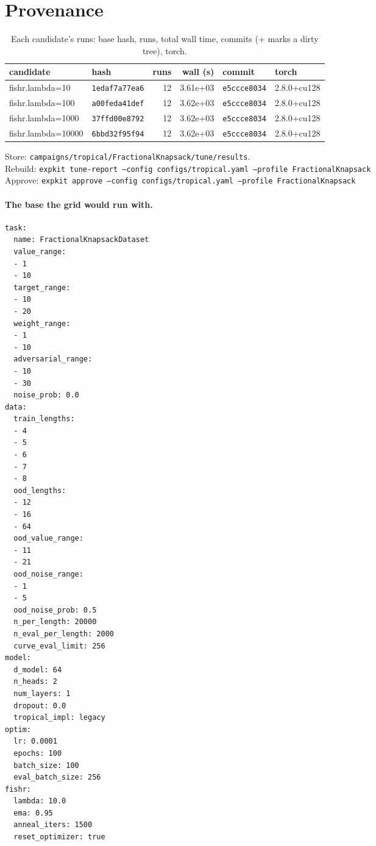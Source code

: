 \documentclass[10pt]{article}
\begin{document}
\section{Provenance}
{\small
\begin{longtable}{llrrll}
\caption{Each candidate's runs: base hash, runs, total wall time, commits (+ marks a dirty tree), torch.}\label{tab:provenance}\\
\toprule
candidate & hash & runs & wall (s) & commit & torch\\
\midrule
\endhead
fishr.lambda=10 & \texttt{1edaf7a77ea6} & 12 & 3.61e+03 & \texttt{e5ccce8034} & 2.8.0+cu128\\
fishr.lambda=100 & \texttt{a00feda41def} & 12 & 3.62e+03 & \texttt{e5ccce8034} & 2.8.0+cu128\\
fishr.lambda=1000 & \texttt{37ffd00e8792} & 12 & 3.62e+03 & \texttt{e5ccce8034} & 2.8.0+cu128\\
fishr.lambda=10000 & \texttt{6bbd32f95f94} & 12 & 3.62e+03 & \texttt{e5ccce8034} & 2.8.0+cu128\\
\bottomrule
\end{longtable}
}
\noindent Store: \texttt{campaigns/tropical/FractionalKnapsack/tune/results}.\\
Rebuild: \texttt{expkit tune-report --config configs/tropical.yaml --profile FractionalKnapsack}\\
Approve: \texttt{expkit approve --config configs/tropical.yaml --profile FractionalKnapsack}

\paragraph{The base the grid would run with.}
{\footnotesize
\begin{verbatim}
task:
  name: FractionalKnapsackDataset
  value_range:
  - 1
  - 10
  target_range:
  - 10
  - 20
  weight_range:
  - 1
  - 10
  adversarial_range:
  - 10
  - 30
  noise_prob: 0.0
data:
  train_lengths:
  - 4
  - 5
  - 6
  - 7
  - 8
  ood_lengths:
  - 12
  - 16
  - 64
  ood_value_range:
  - 11
  - 21
  ood_noise_range:
  - 1
  - 5
  ood_noise_prob: 0.5
  n_per_length: 20000
  n_eval_per_length: 2000
  curve_eval_limit: 256
model:
  d_model: 64
  n_heads: 2
  num_layers: 1
  dropout: 0.0
  tropical_impl: legacy
optim:
  lr: 0.0001
  epochs: 100
  batch_size: 100
  eval_batch_size: 256
fishr:
  lambda: 10.0
  ema: 0.95
  anneal_iters: 1500
  reset_optimizer: true
\end{verbatim}
}

\clearpage
\appendix
\end{document}
